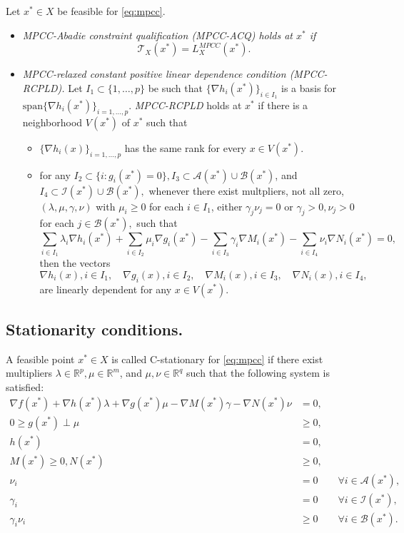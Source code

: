 \documentclass[review,onefignum,onetabnum]{siamonline190516}
\begin{document}
Let $x^*\in X$ be feasible for \eqref{eq:mpcc}.
\begin{itemize}
  \item [(a)] \textit{MPCC-Abadie constraint qualification (MPCC-ACQ) holds at $x^*$ if}
  $$
  \mathcal{T}_X(x^*)=L_X^{MPCC}(x^*).
  $$
  \item [(b)] \textit{MPCC-relaxed constant positive linear dependence condition (MPCC-RCPLD).} Let $I_1\subset\{1,\ldots, p\}$ be such that $\{\nabla h_i(x^*)\}_{i\in I_1}$ is a basis for $\mathrm{span}\{\nabla h_i(x^*)\}_{i=1,\ldots,p}.$ \textit{MPCC-RCPLD} holds at $x^*$ if there is a neighborhood $V(x^*)$ of $x^*$ such that
  \begin{itemize}
  \item $\{\nabla h_i(x)\}_{i=1,\ldots,p}$ has the same rank for every $x\in V(x^*)$.
  \item for any $I_2\subset \{i:g_i(x^*)=0\}, I_3\subset \mathcal{A}(x^*)\cup \mathcal{B}(x^*)$, and $I_4\subset \mathcal{I}(x^*)\cup \mathcal{B}(x^*),$ whenever there exist multpliers, not all zero, $(\lambda,\mu,\gamma,\nu)$ with $\mu_i\geq 0$ for each $i\in I_1$, either $\gamma_j\nu_j=0$ or $\gamma_j>0,\nu_j>0$ for each $j\in\mathcal{B}(x^*),$ such that
  $$
  \sum_{i\in I_1}\lambda_i\nabla h_i(x^*)+\sum_{i\in I_2}\mu_i\nabla g_i(x^*)-\sum_{i\in I_3}\gamma_i\nabla M_i(x^*)-\sum_{i\in I_4}\nu_i\nabla N_i(x^*)=0,
  $$ 
  then the vectors 
  $$
  \nabla h_i(x), i\in I_1, \quad \nabla g_i(x), i\in I_2, \quad \nabla M_i(x), i\in I_3, \quad \nabla N_i(x), i\in I_4,
  $$
  are linearly dependent for any $x\in V(x^*).$
  \end{itemize}
\end{itemize}

\subsection{Stationarity conditions.}
A feasible point $x^*\in X$ is called C-stationary for \eqref{eq:mpcc} if there exist multipliers $\lambda\in \mathbb{R}^p, \mu\in\mathbb{R}^m$, and $\mu, \nu\in \mathbb{R}^q$ such that the following system is satisfied:
\begin{subequations}\label{eq:Csys}
\begin{align}
    \nabla f(x^*)+\nabla h(x^*)\lambda+\nabla g(x^*)\mu-\nabla M(x^*)\gamma-\nabla N(x^*)\nu&=0,\\
    0\geq g(x^*)\perp \mu&\geq 0,\\
    h(x^*)&=0,\\
    M(x^*)\geq 0, N(x^*)&\geq 0,\\
    \nu_i&=0\qquad\forall i\in \mathcal{A}(x^*),\\
    \gamma_i&=0\qquad \forall i\in \mathcal{I}(x^*),\\
    \gamma_i\nu_i&\geq 0\qquad\forall i\in \mathcal{B}(x^*).\label{3.2h}
\end{align}
\end{subequations}
\end{document}
